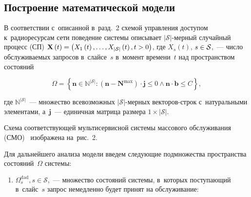 \begin{multicols}{2}
\section{Построение математической модели}\label{sec:mathModel}

\vspace*{-4pt}

В соответствии с~описанной в~разд.~2 схемой 
управ\-ле\-ния доступом к~радиоресурсам сети поведение системы описывает 
$\lvert\mathcal{S}\rvert$-мер\-ный случайный процесс (СП) 
$\mathbf{X}\left(t\right) \hm= \left( X_1\left(t\right),\ldots, 
X_{\lvert\mathcal{S}\rvert}\left(t\right), t\hm>0 \right)$, где 
$X_s\left(t\right)$, $s\hm\in\mathcal{S}$,~--- чис\-ло об\-слу\-жи\-ва\-емых запросов в~слайсе~$s$ 
в~момент времени~$t$ над пространством со\-сто\-яний

\noindent
\begin{equation*}
\Omega =
\left\{
\mathbf{n} \in \mathbb{N}^{\lvert\mathcal{S}\rvert} :
\left( \mathbf{n} - \mathbf{N}^{\max} \right) \cdot \mathbf{j} \leq 0
\land
\mathbf{n} \cdot \mathbf{b} \leq C
\right\},
\end{equation*}

\vspace*{-4pt}

\noindent
где $\mathbb{N}^{\lvert\mathcal{S}\rvert}$~--- множество всевозможных 
$\lvert\mathcal{S}\rvert$-мер\-ных век\-то\-ров-строк с~натуральными элементами, 
а~$\mathbf{j}$~--- единичная матрица размера $1\times \lvert\mathcal{S}\rvert$.

Схема соответствующей мультисервисной сис\-те\-мы массового 
обслуживания (СМО)~\cite{Basharin2013} изображена на~рис.~2. 





Для дальнейшего анализа модели введем следующие подмножества пространства 
состояний~$\Omega$ системы:
\begin{enumerate}[(1)]
\item $\Omega_s^{\mathrm{dad}},s\in\mathcal{S}$,~--- множество состояний системы, в~которых поступающий в~слайс~$s$ запрос немедленно будет принят на 
обслуживание:
\end{enumerate}

{ \begin{center}  %
 \vspace*{-3pt}
    \mbox{%
\epsfxsize=77.767mm
}


\vspace*{3pt}



\end{center}}
\end{multicols}
